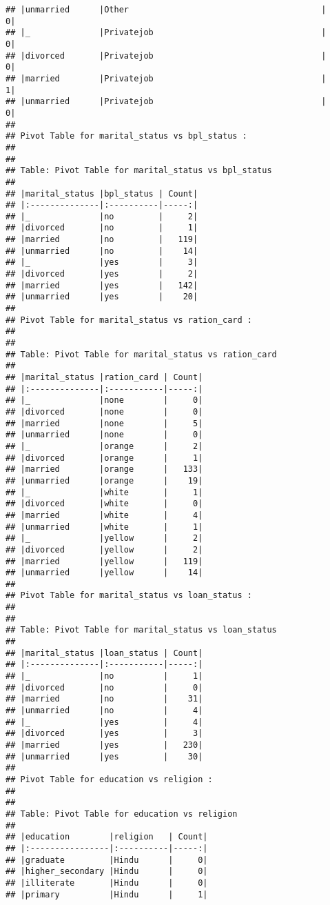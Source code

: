 \documentclass[
]{article}
\begin{document}
\begin{verbatim}
## |unmarried      |Other                                       |     0|
## |_              |Privatejob                                  |     0|
## |divorced       |Privatejob                                  |     0|
## |married        |Privatejob                                  |     1|
## |unmarried      |Privatejob                                  |     0|
## 
## Pivot Table for marital_status vs bpl_status :
## 
## 
## Table: Pivot Table for marital_status vs bpl_status
## 
## |marital_status |bpl_status | Count|
## |:--------------|:----------|-----:|
## |_              |no         |     2|
## |divorced       |no         |     1|
## |married        |no         |   119|
## |unmarried      |no         |    14|
## |_              |yes        |     3|
## |divorced       |yes        |     2|
## |married        |yes        |   142|
## |unmarried      |yes        |    20|
## 
## Pivot Table for marital_status vs ration_card :
## 
## 
## Table: Pivot Table for marital_status vs ration_card
## 
## |marital_status |ration_card | Count|
## |:--------------|:-----------|-----:|
## |_              |none        |     0|
## |divorced       |none        |     0|
## |married        |none        |     5|
## |unmarried      |none        |     0|
## |_              |orange      |     2|
## |divorced       |orange      |     1|
## |married        |orange      |   133|
## |unmarried      |orange      |    19|
## |_              |white       |     1|
## |divorced       |white       |     0|
## |married        |white       |     4|
## |unmarried      |white       |     1|
## |_              |yellow      |     2|
## |divorced       |yellow      |     2|
## |married        |yellow      |   119|
## |unmarried      |yellow      |    14|
## 
## Pivot Table for marital_status vs loan_status :
## 
## 
## Table: Pivot Table for marital_status vs loan_status
## 
## |marital_status |loan_status | Count|
## |:--------------|:-----------|-----:|
## |_              |no          |     1|
## |divorced       |no          |     0|
## |married        |no          |    31|
## |unmarried      |no          |     4|
## |_              |yes         |     4|
## |divorced       |yes         |     3|
## |married        |yes         |   230|
## |unmarried      |yes         |    30|
## 
## Pivot Table for education vs religion :
## 
## 
## Table: Pivot Table for education vs religion
## 
## |education        |religion   | Count|
## |:----------------|:----------|-----:|
## |graduate         |Hindu      |     0|
## |higher_secondary |Hindu      |     0|
## |illiterate       |Hindu      |     0|
## |primary          |Hindu      |     1|

\end{verbatim}
\end{document}
